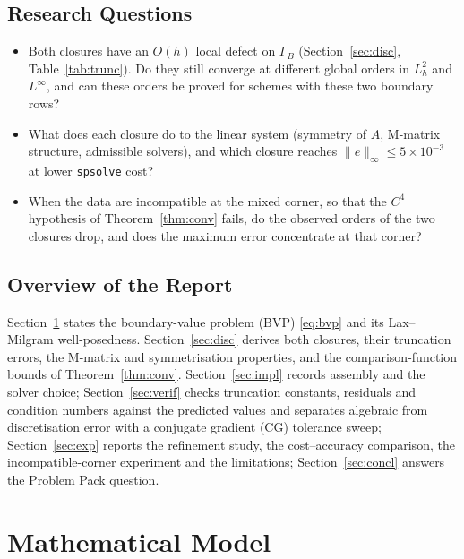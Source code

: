 \documentclass[11pt,a4paper]{article}
\theoremstyle{palplain}
\theoremstyle{paldef}
\theoremstyle{palremark}
\newcommand{\GB}{\Gamma_B}
\begin{document}
\subsection{Research Questions}
\begin{itemize}[leftmargin=2.2em]
  \item[\textbf{Q1.}] Both closures have an $O(h)$ local defect on $\GB$
    (Section~\ref{sec:disc}, Table~\ref{tab:trunc}). Do they still converge at different
    global orders in $L^2_h$ and $L^\infty$, and can these orders be proved for schemes with
    these two boundary rows?
  \item[\textbf{Q2.}] What does each closure do to the linear system (symmetry of $A$, M-matrix
    structure, admissible solvers), and which closure reaches $\|e\|_\infty\le5\times10^{-3}$
    at lower \texttt{spsolve} cost?
  \item[\textbf{Q3.}] When the data are incompatible at the mixed corner, so that the $C^4$
    hypothesis of Theorem~\ref{thm:conv} fails, do the observed orders of the two closures
    drop, and does the maximum error concentrate at that corner?
\end{itemize}

\subsection{Overview of the Report}
Section~\ref{sec:model} states the boundary-value problem (BVP) \eqref{eq:bvp} and its
Lax--Milgram well-posedness. Section~\ref{sec:disc} derives both closures, their truncation
errors, the M-matrix and symmetrisation properties, and the comparison-function bounds of
Theorem~\ref{thm:conv}. Section~\ref{sec:impl} records assembly and the solver choice;
Section~\ref{sec:verif} checks truncation constants, residuals and condition numbers against
the predicted values and separates algebraic from discretisation error with a conjugate
gradient (CG) tolerance sweep; Section~\ref{sec:exp} reports the refinement study, the
cost--accuracy comparison, the incompatible-corner experiment and the limitations;
Section~\ref{sec:concl} answers the Problem Pack question.

\section{Mathematical Model}\label{sec:model}
\end{document}
